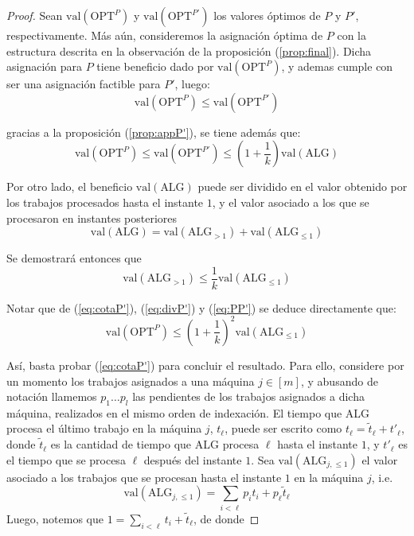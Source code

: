 \documentclass[10pt]{article}
\newcommand{\val}[1]{\text{val}(#1)}
\theoremstyle{plain}
\theoremstyle{definition}
\begin{document}
\begin{proof}
Sean $\val{\text{OPT}^P}$ y $\val{\text{OPT}^{P'}}$ los valores óptimos de $P$ y $P'$, respectivamente. Más aún, consideremos la asignación óptima de $P$ con la estructura descrita en la observación de la proposición (\ref{prop:final}). Dicha asignación para $P$ tiene beneficio dado por $\val{\text{OPT}^P}$, y ademas cumple con ser una asignación factible para $P'$, luego:
\begin{equation}
\label{eq:PP'}
\val{\text{OPT}^P} \leq \val{\text{OPT}^{P'}}
\end{equation}

gracias a la proposición (\ref{prop:appP'}), se tiene además que:
$$
\val{\text{OPT}^P} \leq \val{\text{OPT}^{P'}} \leq \left(1+\frac{1}{k} \right)\val{\text{ALG}}
$$

Por otro lado, el beneficio $\val{\text{ALG}}$ puede ser dividido en el valor obtenido por los trabajos procesados hasta el instante $1$, y el valor asociado a los que se procesaron en instantes posteriores
\begin{equation}
\label{eq:divP'}
\val{\text{ALG}} = \val{\text{ALG}_{>1}} + \val{\text{ALG}_{\leq 1}}
\end{equation}

Se demostrar\'a entonces que
\begin{equation}
\label{eq:cotaP'}
\val{\text{ALG}_{>1}} \leq \frac{1}{k}\val{\text{ALG}_{\leq 1}}
\end{equation}

Notar que de (\ref{eq:cotaP'}), (\ref{eq:divP'}) y (\ref{eq:PP'}) se deduce directamente que:
\begin{equation*}
\val{\text{OPT}^P} \leq \left( 1 + \frac{1}{k} \right)^2\val{\text{ALG}_{\leq 1}}
\end{equation*}

Así, basta probar (\ref{eq:cotaP'}) para concluir el resultado. Para ello, considere por un momento los trabajos asignados a una máquina $j \in [m]$, y abusando de notación llamemos $p_1 \ldots p_l$ las pendientes de los trabajos asignados a dicha máquina, realizados en el mismo orden de indexación. El tiempo que ALG procesa el último trabajo en la máquina $j$, $t_\ell$, puede ser escrito como $t_\ell = \tilde{t}_\ell + t'_\ell$, donde $\tilde{t}_\ell$ es la cantidad de tiempo que ALG procesa $\ell$ hasta el instante $1$, y $t'_\ell$ es el tiempo que se procesa $\ell$ después del instante $1$. Sea $\val{\text{ALG}_{j,\leq 1}}$ el valor asociado a los trabajos que se procesan hasta el instante $1$ en la máquina $j$, i.e.
\begin{equation}
\label{eq:ganjP}
\val{\text{ALG}_{j,\leq 1}}  = \sum_{i <\ell} p_i t_i + p_\ell \tilde{t}_\ell
\end{equation} 
Luego, notemos que $1 = \sum_{i<\ell} t_i + \tilde{t}_{\ell}$, de donde


\end{proof}
\end{document}
